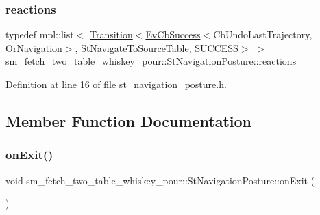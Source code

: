 \subsubsection{\texorpdfstring{reactions}{reactions}}
{\footnotesize\ttfamily typedef mpl\+::list$<$ \hyperlink{classsmacc_1_1Transition}{Transition}$<$\hyperlink{structsmacc_1_1EvCbSuccess}{Ev\+Cb\+Success}$<$Cb\+Undo\+Last\+Trajectory, \hyperlink{classsm__fetch__two__table__whiskey__pour_1_1OrNavigation}{Or\+Navigation}$>$, \hyperlink{structsm__fetch__two__table__whiskey__pour_1_1StNavigateToSourceTable}{St\+Navigate\+To\+Source\+Table}, \hyperlink{structsmacc_1_1default__transition__tags_1_1SUCCESS}{S\+U\+C\+C\+E\+SS}$>$ $>$ \hyperlink{structsm__fetch__two__table__whiskey__pour_1_1StNavigationPosture_a1f23e9bd0f31c8af5842322c0d6931b1}{sm\+\_\+fetch\+\_\+two\+\_\+table\+\_\+whiskey\+\_\+pour\+::\+St\+Navigation\+Posture\+::reactions}}



Definition at line 16 of file st\+\_\+navigation\+\_\+posture.\+h.



\subsection{Member Function Documentation}
\mbox{\label{structsm__fetch__two__table__whiskey__pour_1_1StNavigationPosture_a5e0e6613c360a4787eea61e57c9820f9}} 
\subsubsection{\texorpdfstring{on\+Exit()}{onExit()}}
{\footnotesize\ttfamily void sm\+\_\+fetch\+\_\+two\+\_\+table\+\_\+whiskey\+\_\+pour\+::\+St\+Navigation\+Posture\+::on\+Exit (\begin{DoxyParamCaption}{ }\end{DoxyParamCaption})\hspace{0.3cm}{\ttfamily [inline]}}



